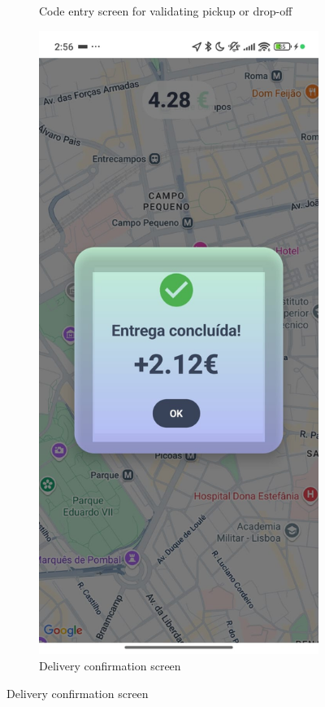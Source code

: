 \begin{figure}[H]
\begin{subfigure}[b]{0.43\textwidth}
        \caption{Code entry screen for validating pickup or drop-off}
    \label{fig:code-verification}
    \end{subfigure}
    \hfill
    \begin{subfigure}[b]{0.43\textwidth}
        \centering
        \includegraphics[width=\textwidth]{images/delivery_finished.jpeg}
        \caption{Delivery confirmation screen}
        \label{fig:delivery-finished}
    \end{subfigure}
\end{figure}

